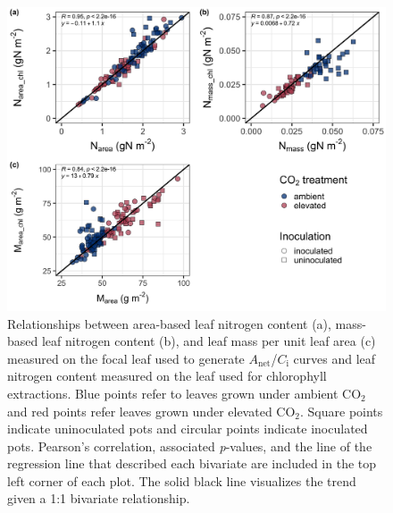 \newpage
\begin{figure}
    \centering
    \includegraphics[scale = 0.0625]{ch5_NxCO2xI/figs/NxCO2xI_figS1_leafN_chl_.png}
    \caption[Relationships between area-based leaf nitrogen content, mass-based leaf nitrogen content, and leaf mass per unit leaf area measured on the focal leaf used to generate $A_\mathrm{net}$/$C_\mathrm{i}$ curves and leaf nitrogen content measured on the leaf used for chlorophyll extractions]{Relationships between area-based leaf nitrogen content (a), mass-based leaf nitrogen content (b), and leaf mass per unit leaf area (c) measured on the focal leaf used to generate $A_\mathrm{net}$/$C_\mathrm{i}$ curves and leaf nitrogen content measured on the leaf used for chlorophyll extractions. Blue points refer to leaves grown under ambient CO$_2$ and red points refer leaves grown under elevated CO$_2$. Square points indicate uninoculated pots and circular points indicate inoculated pots. Pearson's correlation, associated \textit{p}-values, and the line of the regression line that described each bivariate are included in the top left corner of each plot. The solid black line visualizes the trend given a 1:1 bivariate relationship.}
    \label{fig:figure.d1}
\end{figure}
\clearpage


